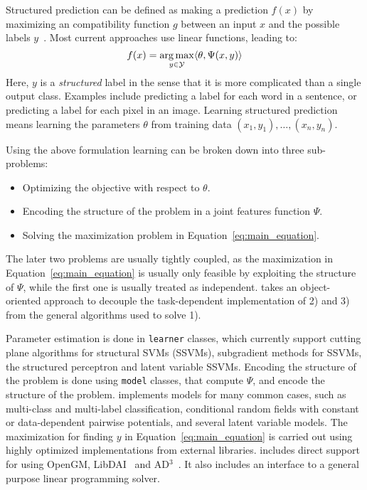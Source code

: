 Structured prediction can be defined as making a prediction $f(x)$ by maximizing an
compatibility function $g$ between an input $x$ and the possible labels
$y$~\cite{nowozin2011structured}. Most current approaches use linear functions,
leading to:
\begin{equation}\label{eq:main_equation}
    f(x) = \operatorname*{arg\,max}_{y \in \mathcal{Y}} \langle \theta, \Psi(x, y) \rangle 
\end{equation}
Here, $y$ is a \emph{structured} label in the sense that it is more complicated than a single
output class. Examples include predicting a label for each word in a sentence, or predicting
a label for each pixel in an image.
Learning structured prediction means learning the parameters $\theta$ from training data
$(x_1, y_1), \dotsc, (x_n, y_n)$.

Using the above formulation learning can be broken down into three sub-problems:
\begin{itemize}
    \item Optimizing the objective with respect to $\theta$.
    \item Encoding the structure of the problem in a joint features function $\Psi$.
    \item Solving the maximization problem in Equation~\ref{eq:main_equation}.
\end{itemize}

The later two problems are usually tightly coupled, as the maximization in
Equation~\ref{eq:main_equation} is usually only feasible by exploiting the
structure of $\Psi$, while the first one is usually treated as independent.
\pystruct takes an object-oriented approach to decouple the task-dependent
implementation of 2) and 3) from the general algorithms used to solve 1).

Parameter estimation is done in \texttt{learner} classes, which currently support
cutting plane algorithms for structural SVMs (SSVMs), subgradient methods for SSVMs,
the structured perceptron and latent variable SSVMs.
Encoding the structure of the problem is done using \texttt{model} classes, that
compute $\Psi$, and encode the structure of the problem.
\pystruct implements models for many common cases, such as multi-class and
multi-label classification, conditional random fields with constant or
data-dependent pairwise potentials, and several latent variable models.
The maximization for finding $y$ in Equation~\ref{eq:main_equation} is carried out
using highly optimized implementations from external libraries. \pystruct
includes direct support for using {\sc OpenGM}, {\sc LibDAI}~\citep{Mooij_libDAI_10} and {\sc
AD$^3$}~\citep{martins2011augmented}. It also includes an interface to a
general purpose linear programming solver.

